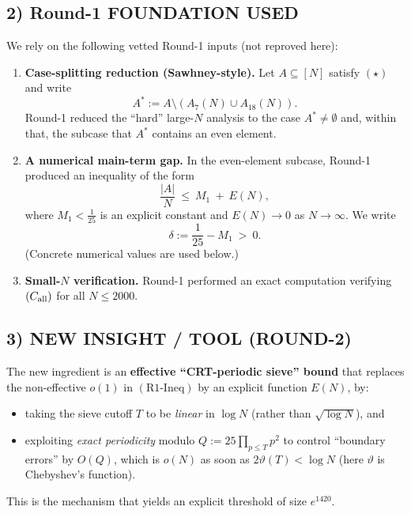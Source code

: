 \subsection*{2) Round-1 FOUNDATION USED}
We rely on the following vetted Round-1 inputs (not reproved here):
\begin{enumerate}
\item \textbf{Case-splitting reduction (Sawhney-style).}
Let $A\subseteq [N]$ satisfy $(\star)$ and write
\[
A^\ast:=A\setminus (A_7(N)\cup A_{18}(N)).
\]
Round-1 reduced the ``hard'' large-$N$ analysis to the case $A^\ast\neq\emptyset$ and, within that, the subcase that $A^\ast$ contains an even element.
\item \textbf{A numerical main-term gap.}
In the even-element subcase, Round-1 produced an inequality of the form
\[
\frac{|A|}{N}\ \le\ M_1\ +\ E(N),
\tag{R1-Ineq}
\]
where $M_1<\frac1{25}$ is an explicit constant and $E(N)\to 0$ as $N\to\infty$.  We write
\[
\delta:=\frac1{25}-M_1\ >\ 0.
\]
(Concrete numerical values are used below.)
\item \textbf{Small-$N$ verification.}
Round-1 performed an exact computation verifying $(C_{\rm all})$ for all $N\le 2000$.
\end{enumerate}

\subsection*{3) NEW INSIGHT / TOOL (ROUND-2)}
The new ingredient is an \textbf{effective ``CRT-periodic sieve'' bound} that replaces the non-effective $o(1)$ in $(\text{R1-Ineq})$ by an explicit function $E(N)$, by:
\begin{itemize}
\item taking the sieve cutoff $T$ to be \emph{linear} in $\log N$ (rather than $\sqrt{\log N}$), and
\item exploiting \emph{exact periodicity} modulo $Q:=25\prod_{p\le T}p^2$ to control ``boundary errors'' by $O(Q)$, which is $o(N)$ as soon as $2\vartheta(T)<\log N$ (here $\vartheta$ is Chebyshev's function).
\end{itemize}
This is the mechanism that yields an explicit threshold of size $e^{1420}$.

